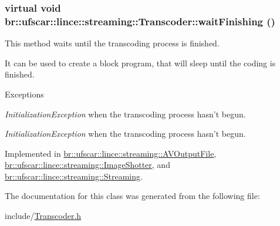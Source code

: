 \hypertarget{classbr_1_1ufscar_1_1lince_1_1streaming_1_1Transcoder_abec1e8b2d9e04e79bf878206a70df2d9}{
\subsubsection[{waitFinishing}]{\setlength{\rightskip}{0pt plus 5cm}virtual void br::ufscar::lince::streaming::Transcoder::waitFinishing ()}}
\label{classbr_1_1ufscar_1_1lince_1_1streaming_1_1Transcoder_abec1e8b2d9e04e79bf878206a70df2d9}


This method waits until the transcoding process is finished. 

It can be used to create a block program, that will sleep until the coding is finished. 
\begin{DoxyExceptions}{Exceptions}
\item[{\em InitializationException}]when the transcoding process hasn't begun. \item[{\em InitializationException}]when the transcoding process hasn't begun. \end{DoxyExceptions}


Implemented in \hyperlink{classbr_1_1ufscar_1_1lince_1_1streaming_1_1AVOutputFile_acd69fe24c54d43ae5add25e3917286bb}{br::ufscar::lince::streaming::AVOutputFile}, \hyperlink{classbr_1_1ufscar_1_1lince_1_1streaming_1_1ImageShotter_ac65dc640a0e5d28661029fb387f18a1a}{br::ufscar::lince::streaming::ImageShotter}, and \hyperlink{classbr_1_1ufscar_1_1lince_1_1streaming_1_1Streaming_abe9c0683b3b97fe5c924907ce4c7b803}{br::ufscar::lince::streaming::Streaming}.



The documentation for this class was generated from the following file:\begin{DoxyCompactItemize}
\item 
include/\hyperlink{Transcoder_8h}{Transcoder.h}\end{DoxyCompactItemize}
